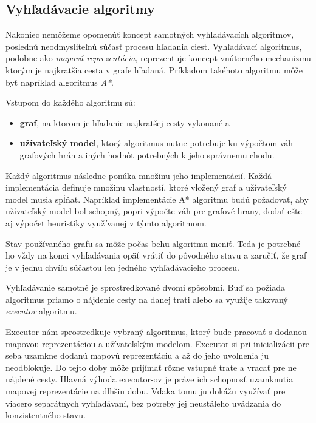 \subsection{Vyhľadávacie algoritmy}\label{vyhladavacie_algoritmy}

Nakoniec nemôžeme opomenúť koncept samotných vyhľadávacích algoritmov, poslednú neodmysliteľnú súčasť procesu hľadania ciest. Vyhľadávací algoritmus, podobne ako \textit{mapová reprezentácia}, reprezentuje koncept vnútorného mechanizmu ktorým je najkratšia cesta v grafe hľadaná. Príkladom takéhoto algoritmu môže byť napríklad algoritmus \textit{A*}. 

Vstupom do každého algoritmu sú:
\begin{itemize}
    \item \textbf{graf}, na ktorom je hľadanie najkratšej cesty vykonané a 
    \item \textbf{užívateľský model}, ktorý algoritmus nutne potrebuje ku výpočtom váh grafových hrán a iných hodnôt potrebných k jeho správnemu chodu.  
\end{itemize}

Každý algoritmus následne ponúka množinu jeho implementácií. Každá implementácia definuje množinu vlastností, ktoré vložený graf a užívateľský model musia spĺňať. Napríklad implementácie A* algoritmu budú požadovať, aby užívateľský model bol schopný, popri výpočte váh pre grafové hrany, dodať ešte aj výpočet heuristiky využívanej v týmto algoritmom.

Stav používaného grafu sa môže počas behu algoritmu meniť. Teda je potrebné ho vždy na konci vyhľadávania opäť vrátiť do pôvodného stavu a zaručiť, že graf je v jednu chvíľu súčasťou len jedného vyhľadávacieho procesu.

Vyhľadávanie samotné je sprostredkované dvomi spôsobmi. Buď sa požiada algoritmus priamo o nájdenie cesty na danej trati alebo sa využije takzvaný \textit{executor} algoritmu. 

Executor nám sprostredkuje vybraný algoritmus, ktorý bude pracovať s dodanou mapovou reprezentáciou a užívateľským modelom. Executor si pri inicializácii pre seba uzamkne dodanú mapovú reprezentáciu a až do jeho uvolnenia ju neodblokuje. Do tejto doby môže prijímať rôzne vstupné trate a vracať pre ne nájdené cesty. Hlavná výhoda executor-ov je práve ich schopnosť uzamknutia mapovej reprezentácie na dlhšiu dobu. Vďaka tomu ju dokážu využívať pre viacero separátnych vyhľadávaní, bez potreby jej neustáleho uvádzania do konzistentného stavu.  

